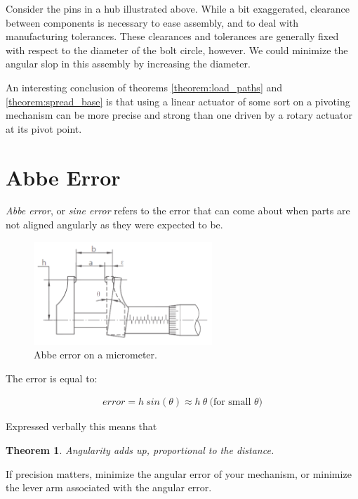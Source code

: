 \documentclass[10pt,letterpaper]{book}
\newtheorem{theorem}{Theorem}
\begin{document}
Consider the pins in a hub illustrated above. While a bit exaggerated, clearance between components is necessary to ease assembly, and to deal with manufacturing tolerances. These clearances and tolerances are generally fixed with respect to the diameter of the bolt circle, however. We could minimize the angular slop in this assembly by increasing the diameter.

An interesting conclusion of theorems \ref{theorem:load_paths} and \ref{theorem:spread_base} is that using a linear actuator of some sort on a pivoting mechanism can be more precise and strong than one driven by a rotary actuator at its pivot point.

\section{Abbe Error}

\textit{Abbe error}, or \textit{sine error} refers to the error that can come about when parts are not aligned angularly as they were expected to be.

\begin{figure}[H]
	\includegraphics[width=0.6\textwidth]{imgs/abbe_error.png}
	\caption{Abbe error on a micrometer.}
\end{figure}

The error is equal to:

\begin{align}
	error = h \ sin(\theta) \approx h \ \theta \ \mbox{(for small $\theta$)}
\end{align}

Expressed verbally this means that

\begin{theorem} \label{theorem:abbe}
Angularity adds up, proportional to the distance.
\end{theorem}

If precision matters, minimize the angular error of your mechanism, or minimize the lever arm associated with the angular error.
\end{document}
